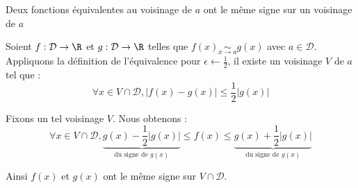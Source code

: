 \documentclass{article}
\begin{document}
	
	\begin{question_kholle}
		{Deux fonctions équivalentes au voisinage de $a$ ont le même signe sur un voisinage de $a$}
		
		Soient $f : \mathcal{D} \rightarrow \R$ et $g : \mathcal{D} \rightarrow \R$ telles que $f(x) \underset{x \rightarrow a}{\sim} g(x)$ avec $a \in \mathcal{D}$. \\
		Appliquons la définition de l'équivalence pour $\epsilon \leftarrow \frac{1}{2}$, il existe un voisinage $V$ de $a$ tel que :
		\begin{equation*}
			\forall x \in V \cap \mathcal{D},
			| f(x) - g(x) | \leqslant \frac{1}{2} | g(x) |
		\end{equation*}
	
		Fixons un tel voisinage $V$.
		Nous obtenons :
		\begin{equation*}
			\forall x \in V \cap \mathcal{D},
			\underbrace{g(x) - \frac{1}{2} | g(x) |}_{\text{du signe de }g(x)}
			\leqslant f(x) \leqslant
			\underbrace{g(x) + \frac{1}{2} | g(x) |}_{\text{du signe de }g(x)}
		\end{equation*}
	
		Ainsi $f(x)$ et $g(x)$ ont le même signe sur $V \cap \mathcal{D}$.
	\end{question_kholle}
\end{document}

